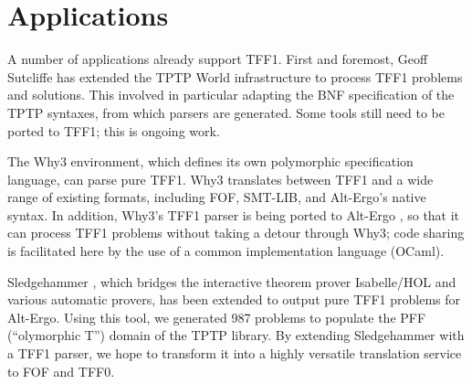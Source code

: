 \section{Applications}
\label{sec_apps}

A number of applications already support TFF1. First and foremost, Geoff
Sutcliffe has extended the TPTP World infrastructure to process TFF1 problems
and solutions. This involved in particular adapting the BNF specification of the
TPTP syntaxes, from which parsers are generated. Some tools still need to be
ported to TFF1; this is ongoing work.

\pagebreak[1] %

The Why3 \cite{bobot-et-al-2011} environment, which defines its own polymorphic
specification language, can parse pure TFF1. Why3 translates
between TFF1 and a wide range of existing formats, including FOF, SMT-LIB, and
Alt-Ergo's native syntax. In addition, Why3's TFF1 parser is being ported to
Alt-Ergo \cite{bobot-et-al-2008}, so that it can process TFF1 problems without
taking a detour through Why3; code sharing is facilitated here by the use of
a common implementation language (OCaml).

Sledgehammer \cite{paulson-blanchette-2010}, which bridges the interactive
theorem prover Isabelle\slash HOL and various automatic provers, has been
extended to output pure TFF1 problems for Alt-Ergo. Using this tool, we
generated 987 problems to populate the PFF (``olymorphic T'')
domain of the TPTP library. By extending Sledgehammer with a TFF1 parser,
we hope to transform it into a highly versatile translation service to FOF and
TFF0.



